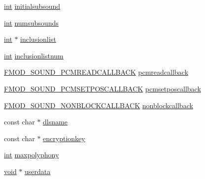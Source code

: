 \begin{DoxyCompactItemize}
\item 
\hyperlink{wglew_8h_a500a82aecba06f4550f6849b8099ca21}{int} \hyperlink{struct_f_m_o_d___c_r_e_a_t_e_s_o_u_n_d_e_x_i_n_f_o_a0b6b37604abb632c74c1912b7de6cf8a}{initialsubsound}
\item 
\hyperlink{wglew_8h_a500a82aecba06f4550f6849b8099ca21}{int} \hyperlink{struct_f_m_o_d___c_r_e_a_t_e_s_o_u_n_d_e_x_i_n_f_o_a84eebd6ba29eb025470d074fb9c36c32}{numsubsounds}
\item 
\hyperlink{wglew_8h_a500a82aecba06f4550f6849b8099ca21}{int} $\ast$ \hyperlink{struct_f_m_o_d___c_r_e_a_t_e_s_o_u_n_d_e_x_i_n_f_o_a6a9fda68184f91419dd8d523db749ad7}{inclusionlist}
\item 
\hyperlink{wglew_8h_a500a82aecba06f4550f6849b8099ca21}{int} \hyperlink{struct_f_m_o_d___c_r_e_a_t_e_s_o_u_n_d_e_x_i_n_f_o_ab06a599a0214646ffe412edc75ef812e}{inclusionlistnum}
\item 
\hyperlink{fmod_8h_ae86401469020341dcbf545855415deaa}{F\-M\-O\-D\-\_\-\-S\-O\-U\-N\-D\-\_\-\-P\-C\-M\-R\-E\-A\-D\-C\-A\-L\-L\-B\-A\-C\-K} \hyperlink{struct_f_m_o_d___c_r_e_a_t_e_s_o_u_n_d_e_x_i_n_f_o_aa58ca119eb7ae9de48bd4a187d9e9e45}{pcmreadcallback}
\item 
\hyperlink{fmod_8h_a5c8f343c332838ad63b25f72778196ac}{F\-M\-O\-D\-\_\-\-S\-O\-U\-N\-D\-\_\-\-P\-C\-M\-S\-E\-T\-P\-O\-S\-C\-A\-L\-L\-B\-A\-C\-K} \hyperlink{struct_f_m_o_d___c_r_e_a_t_e_s_o_u_n_d_e_x_i_n_f_o_ac8e4d22cd238655b7b9a4d5c4623601c}{pcmsetposcallback}
\item 
\hyperlink{fmod_8h_aec6d952393aee1836dbdc8c21cbc9ff4}{F\-M\-O\-D\-\_\-\-S\-O\-U\-N\-D\-\_\-\-N\-O\-N\-B\-L\-O\-C\-K\-C\-A\-L\-L\-B\-A\-C\-K} \hyperlink{struct_f_m_o_d___c_r_e_a_t_e_s_o_u_n_d_e_x_i_n_f_o_ac7d4f60695e9ae96c478692bb404e586}{nonblockcallback}
\item 
const char $\ast$ \hyperlink{struct_f_m_o_d___c_r_e_a_t_e_s_o_u_n_d_e_x_i_n_f_o_aa6f4ef3daecbc7e005ee9facd53426a7}{dlsname}
\item 
const char $\ast$ \hyperlink{struct_f_m_o_d___c_r_e_a_t_e_s_o_u_n_d_e_x_i_n_f_o_a42ac3b92a72225370ac41846709a1bbd}{encryptionkey}
\item 
\hyperlink{wglew_8h_a500a82aecba06f4550f6849b8099ca21}{int} \hyperlink{struct_f_m_o_d___c_r_e_a_t_e_s_o_u_n_d_e_x_i_n_f_o_ad2bc771aa24ba582d645845a3d98426c}{maxpolyphony}
\item 
\hyperlink{wglew_8h_aeea6e3dfae3acf232096f57d2d57f084}{void} $\ast$ \hyperlink{struct_f_m_o_d___c_r_e_a_t_e_s_o_u_n_d_e_x_i_n_f_o_ab3c42629445aefd11256e4e3b411c23f}{userdata}
\item 

\end{DoxyCompactItemize}
